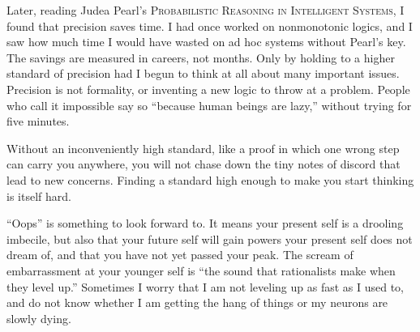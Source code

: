 Later, reading Judea Pearl's \textsc{Probabilistic Reasoning in Intelligent Systems}, I found that precision saves time. I had once worked on nonmonotonic logics, and I saw how much time I would have wasted on ad hoc systems without Pearl's key. The savings are measured in careers, not months. Only by holding to a higher standard of precision had I begun to think at all about many important issues. Precision is not formality, or inventing a new logic to throw at a problem. People who call it impossible say so ``because human beings are lazy,'' without trying for five minutes. 

Without an inconveniently high standard, like a proof in which one wrong step can carry you anywhere, you will not chase down the tiny notes of discord that lead to new concerns. Finding a standard high enough to make you start thinking is itself hard.

``Oops'' is something to look forward to. It means your present self is a drooling imbecile, but also that your future self will gain powers your present self does not dream of, and that you have not yet passed your peak. The scream of embarrassment at your younger self is ``the sound that rationalists make when they level up.'' Sometimes I worry that I am not leveling up as fast as I used to, and do not know whether I am getting the hang of things or my neurons are slowly dying.
